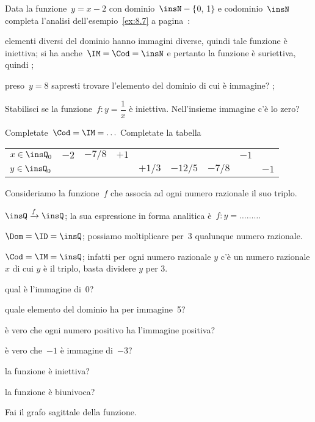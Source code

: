 
\begin{esercizio}
 \label{ese:8.7}
Data la funzione~$y=x-2$ con dominio~$\insN-\{$0, 1$\}$ e codominio~$\insN$ completa l'analisi dell'esempio~\ref{ex:8.7} a pagina~\pageref{ex:8.7}:
\begin{enumeratea}
\item elementi diversi del dominio hanno immagini diverse, quindi tale funzione è iniettiva;
si ha anche~$\IM =\Cod= \insN$ e pertanto la funzione è suriettiva, quindi \dotfill;
\item preso~$y = 8$ sapresti trovare l'elemento del dominio di cui è immagine? \dotfill;
\end{enumeratea}
\end{esercizio}

\begin{esercizio}
 \label{ese:8.8}
Stabilisci se la funzione~$f:y=\dfrac{1}{x}$ è
iniettiva. Nell'insieme immagine c'è lo zero?

Completate~$\Cod = \IM =\ldots$
Completate la tabella
\begin{center}
\begin{tabular}{l*8{c}}
\toprule
$x\in \insQ_{0}$ & $-2$ & $-7/8$ & $+1$ & & & & $-1$ & \\
$y\in \insQ_{0}$ & & & & $+1/3$ & $-12/5$ & $-7/8$ & & $-1$\\
\bottomrule
\end{tabular}
\end{center}
\end{esercizio}

\begin{esercizio}
 \label{ese:8.9}
Consideriamo la funzione~$f$ che associa ad ogni numero razionale il suo triplo.

$\insQ\xrightarrow{f}\insQ$; la sua espressione in forma
analitica è~$f: y = \dots\dots\dots$

$\Dom = \ID = \insQ$; possiamo moltiplicare per~3 qualunque numero razionale.

$\Cod = \IM =\insQ$; infatti per ogni numero razionale $y$ c'è un numero razionale $x$ di cui $y$ è il triplo, basta dividere $y$ per 3.
%

\begin{enumeratea}
\item qual è l'immagine di~0?\dotfill
\item quale elemento del dominio ha per immagine~5?\dotfill
\item è vero che ogni numero positivo ha l'immagine positiva?\dotfill
\item è vero che~$-1$ è immagine di~$-3$?\dotfill
\item la funzione è iniettiva?\dotfill
\item la funzione è biunivoca?\dotfill
\end{enumeratea}
Fai il grafo sagittale della funzione.
\end{esercizio}

